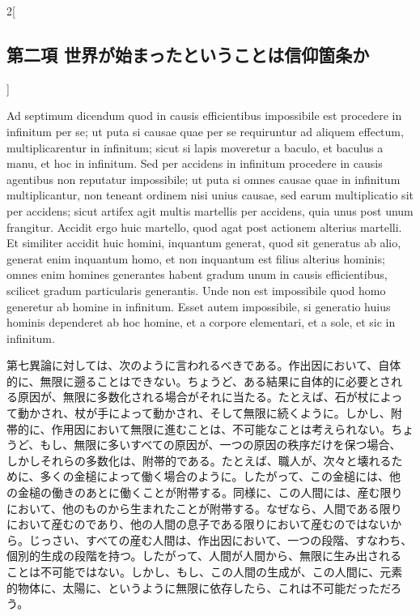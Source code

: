 \documentclass[paper=a4paper,fontsize=10pt,jafontsize=9pt,titlepage]{jlreq}
\begin{document}
\begin{paracol}{2}[\subsection{第二項 世界が始まったということは信仰箇条か}]
\switchcolumn*[\subsection{ad.7}]


Ad septimum dicendum quod in causis efficientibus impossibile est
 procedere in infinitum per se; ut puta si causae quae per se
 requiruntur ad aliquem effectum, multiplicarentur in infinitum; sicut
 si lapis moveretur a baculo, et baculus a manu, et hoc in
 infinitum. Sed per accidens in infinitum procedere in causis agentibus
 non reputatur
 impossibile; ut puta si omnes causae quae in infinitum
 multiplicantur, non teneant ordinem nisi unius causae, sed earum
 multiplicatio sit per accidens; sicut artifex agit multis martellis per
 accidens, quia unus post unum frangitur. Accidit ergo huic martello,
 quod agat post actionem alterius martelli. Et similiter accidit huic
 homini, inquantum generat, quod sit generatus ab alio, generat enim
 inquantum homo, et non inquantum est filius alterius hominis; omnes
 enim homines generantes habent gradum unum in causis efficientibus,
 scilicet gradum particularis generantis. Unde non est impossibile quod
 homo generetur ab homine in infinitum. Esset autem impossibile, si
 generatio huius hominis dependeret ab hoc homine, et a corpore
 elementari, et a sole, et sic in infinitum.


\switchcolumn


第七異論に対しては、次のように言われるべきである。作出因において、自体
的に、無限に遡ることはできない。ちょうど、ある結果に自体的に必要とされ
る原因が、無限に多数化される場合がそれに当たる。たとえば、石が杖によっ
て動かされ、杖が手によって動かされ、そして無限に続くように。しかし、附
帯的に、作用因において無限に進むことは、不可能なことは考えられない。ちょ
うど、もし、無限に多いすべての原因が、一つの原因の秩序だけを保つ場合、
しかしそれらの多数化は、附帯的である。たとえば、職人が、次々と壊れるた
めに、多くの金槌によって働く場合のように。したがって、この金槌には、他
の金槌の働きのあとに働くことが附帯する。同様に、この人間には、産む限り
において、他のものから生まれたことが附帯する。なぜなら、人間である限り
において産むのであり、他の人間の息子である限りにおいて産むのではないか
ら。じっさい、すべての産む人間は、作出因において、一つの段階、すなわち、
個別的生成の段階を持つ。したがって、人間が人間から、無限に生み出される
ことは不可能ではない。しかし、もし、この人間の生成が、この人間に、元素
的物体に、太陽に、というように無限に依存したら、これは不可能だっただろ
う。



\end{paracol}
\end{document}

